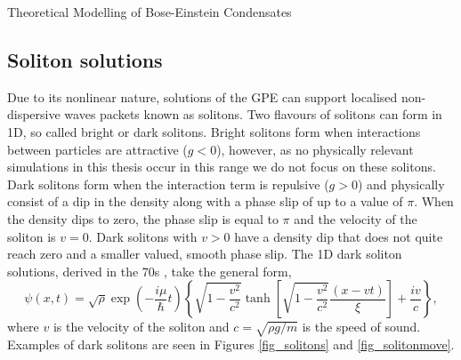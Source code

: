 \begin{chapter}{\label{cha:theoretical_model}Theoretical Modelling of Bose-Einstein Condensates}
	\subsection{\label{section:soliton} Soliton solutions}
	Due to its nonlinear nature, solutions of the GPE can support localised non-dispersive waves packets known as solitons. Two flavours of solitons can form in 1D, so called bright or dark solitons. Bright solitons form when interactions between particles are attractive ($g<0$), however, as no physically relevant simulations in this thesis occur in this range we do not focus on these solitons. Dark solitons form when the interaction term is repulsive ($g>0$) and physically consist of a dip in the density along with a phase slip of up to a value of $\pi$. When the density dips to zero, the phase slip is equal to $\pi$ and the velocity of the soliton is $v=0$. Dark solitons with $v>0$ have a density dip that does not quite reach zero and a smaller valued, smooth phase slip. The 1D dark soliton solutions, derived in the 70s \cite{zakharov72,zakharov73}, take the general form,
	\begin{equation}
		\psi(x,t) = \sqrt{\rho}\exp\left(-\frac{i\mu}{\hbar}t\right)\left\{ \sqrt{1-\frac{v^2}{c^2}} \tanh\left[ \sqrt{1-\frac{v^2}{c^2}}\frac{(x-vt)}{\xi} \right ] + \frac{iv}{c}  \right \} ,
	\end{equation}
	where $v$ is the velocity of the soliton and $c=\sqrt{\rho g/m}$ is the speed of sound. Examples of dark solitons are seen in Figures \ref{fig_solitons} and \ref{fig_solitonmove}.
	\begin{figure}[!ht]
	\centering
\end{figure}
\end{chapter}
